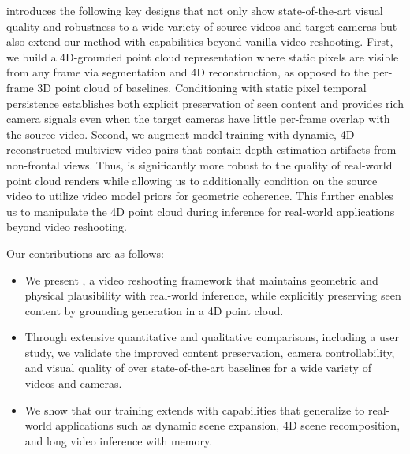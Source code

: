 \methodname introduces the following key designs that not only show state-of-the-art visual quality and robustness to a wide variety of source videos and target cameras but also extend our method with capabilities beyond vanilla video reshooting. First, we build a 4D-grounded point cloud representation where static pixels are visible from any frame via segmentation and 4D reconstruction, as opposed to the per-frame 3D point cloud of baselines. Conditioning with static pixel temporal persistence establishes both explicit preservation of seen content and provides rich camera signals even when the target cameras have little per-frame overlap with the source video. Second, we augment model training with dynamic, 4D-reconstructed multiview video pairs that contain depth estimation artifacts from non-frontal views. Thus, \methodname is significantly more robust to the quality of real-world point cloud renders while allowing us to additionally condition on the source video to utilize video model priors for geometric coherence. This further enables us to manipulate the 4D point cloud during inference for real-world applications beyond video reshooting.

Our contributions are as follows:
\begin{itemize}
    \item We present \methodname, a video reshooting framework that maintains geometric and physical plausibility with real-world inference, while explicitly preserving seen content by grounding generation in a 4D point cloud.
    \item Through extensive quantitative and qualitative comparisons, including a user study, we validate the improved content preservation, camera controllability, and visual quality of \methodname over state-of-the-art baselines for a wide variety of videos and cameras.
    \item We show that our training extends \methodname with capabilities that generalize to real-world applications such as dynamic scene expansion, 4D scene recomposition, and long video inference with memory.
\end{itemize}

